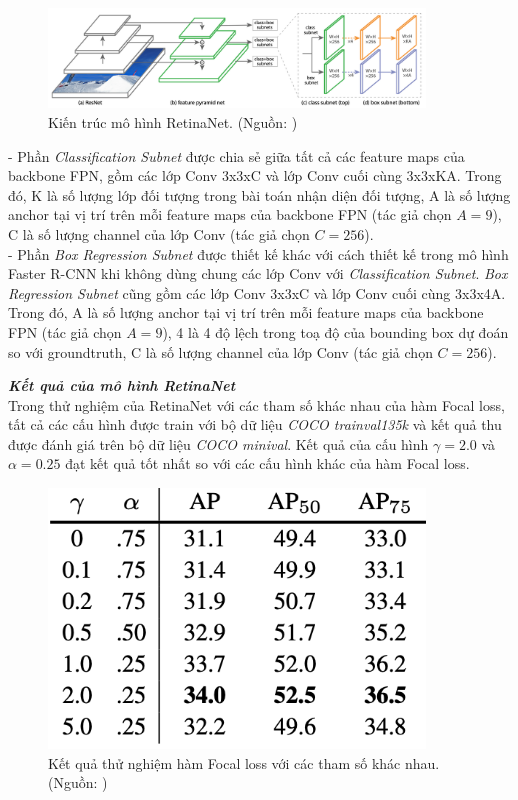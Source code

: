 {    \begin{figure}[H]
        \centering
        \includegraphics[width=10cm] {images/retinanet_model}
        \caption{Kiến trúc mô hình RetinaNet. (Nguồn: \cite{lin2017focal})}
        \label{fig:retinanet_model}
    \end{figure}

    \noindent
    - Phần \textit{Classification Subnet} được chia sẻ giữa tất cả các feature maps của backbone FPN, gồm các lớp Conv 3x3xC và lớp Conv cuối cùng 3x3xKA.
    Trong đó, K là số lượng lớp đối tượng trong bài toán nhận diện đối tượng, A là số lượng anchor tại vị trí trên mỗi feature maps của backbone FPN (tác giả chọn $A = 9$), C là số lượng channel của lớp Conv (tác giả chọn $C = 256$). \\
    - Phần \textit{Box Regression Subnet} được thiết kế khác với cách thiết kế trong mô hình Faster R-CNN khi không dùng chung các lớp Conv với \textit{Classification Subnet}.
    \textit{Box Regression Subnet} cũng gồm các lớp Conv 3x3xC và lớp Conv cuối cùng 3x3x4A.
    Trong đó, A là số lượng anchor tại vị trí trên mỗi feature maps của backbone FPN (tác giả chọn $A = 9$), 4 là 4 độ lệch trong toạ độ của bounding box dự đoán so với groundtruth, C là số lượng channel của lớp Conv (tác giả chọn $C = 256$).

    \noindent
    \textbf{\textit{Kết quả của mô hình RetinaNet}} \\
    Trong thử nghiệm của RetinaNet với các tham số khác nhau của hàm Focal loss, tất cả các cấu hình được train với bộ dữ liệu \textit{COCO trainval135k} và kết quả thu được đánh giá trên bộ dữ liệu \textit{COCO minival}.
    Kết quả của cấu hình $\gamma = 2.0$ và $\alpha = 0.25$ đạt kết quả tốt nhất so với các cấu hình khác của hàm Focal loss.

    \begin{figure}[H]
        \centering
        \includegraphics[width=10cm] {images/retinanet_results_2}
        \caption{Kết quả thử nghiệm hàm Focal loss với các tham số khác nhau. (Nguồn: \cite{lin2017focal})}
        \label{fig:retinanet_results_2}
    \end{figure}

}
